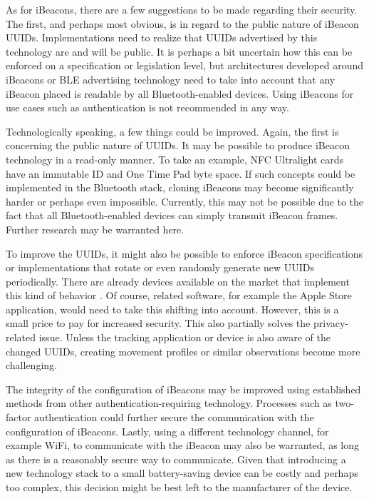As for iBeacons, there are a few suggestions to be made regarding their security. The first, and perhaps most obvious, is in regard to the public nature of iBeacon UUIDs. Implementations need to realize that UUIDs advertised by this technology are and will be public. It is perhaps a bit uncertain how this can be enforced on a specification or legislation level, but architectures developed around iBeacons or \ac{BLE} advertising technology need to take into account that any iBeacon placed is readable by all Bluetooth-enabled devices. Using iBeacons for use cases such as authentication is not recommended in any way.

Technologically speaking, a few things could be improved. Again, the first is concerning the public nature of UUIDs. It may be possible to produce iBeacon technology in a read-only manner. To take an example, \ac{NFC} Ultralight cards have an immutable ID and One Time Pad byte space. If such concepts could be implemented in the Bluetooth stack, cloning iBeacons may become significantly harder or perhaps even impossible. Currently, this may not be possible due to the fact that all Bluetooth-enabled devices can simply transmit iBeacon frames. Further research may be warranted here.

To improve the UUIDs, it might also be possible to enforce iBeacon specifications or implementations that rotate or even randomly generate new UUIDs periodically. There are already devices available on the market that implement this kind of behavior \cite{survey}. Of course, related software, for example the Apple Store application, would need to take this shifting into account. However, this is a small price to pay for increased security. This also partially solves the privacy-related issue. Unless the tracking application or device is also aware of the changed UUIDs, creating movement profiles or similar observations become more challenging.

The integrity of the configuration of iBeacons may be improved using established methods from other authentication-requiring technology. Processes such as two-factor authentication could further secure the communication with the configuration of iBeacons. Lastly, using a different technology channel, for example WiFi, to communicate with the iBeacon may also be warranted, as long as there is a reasonably secure way to communicate. Given that introducing a new technology stack to a small battery-saving device can be costly and perhaps too complex, this decision might be best left to the manufacturer of the device.

